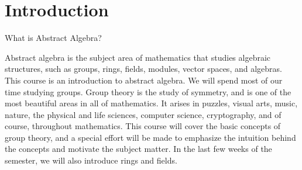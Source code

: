 \chapter{Introduction}
\thispagestyle{empty}

\begin{section}{What is Abstract Algebra?}

Abstract algebra is the subject area of mathematics that studies algebraic structures, such as groups, rings, fields, modules, vector spaces, and algebras. This course is an introduction to abstract algebra. We will spend most of our time studying groups. Group theory is the study of symmetry, and is one of the most beautiful areas in all of mathematics. It arises in puzzles, visual arts, music, nature, the physical and life sciences, computer science, cryptography, and of course, throughout mathematics. This course will cover the basic concepts of group theory, and a special effort will be made to emphasize the intuition behind the concepts and motivate the subject matter.  In the last few weeks of the semester, we will also introduce rings and fields.

\end{section}

